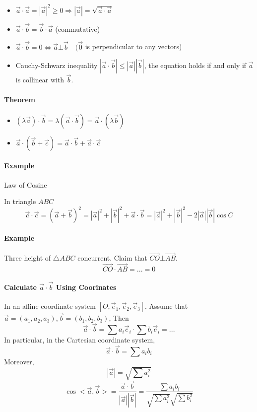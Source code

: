 \documentclass[11pt]{book}
\begin{document}
\begin{itemize}
  \item $\vec a \cdot \vec a  = |\vec a |^2 \geq 0 \Rightarrow |\vec a| = \sqrt{\vec a \cdot \vec a}$
  \item $\vec a \cdot \vec b  = \vec b \cdot \vec a$ (commutative)
  \item $\vec a \cdot \vec b = 0 \iff \vec a \bot \vec b \quad (\vec 0$ is perpendicular to any vectors)
  \item Cauchy-Schwarz inequality $|\vec a \cdot \vec b| \leq |\vec a|| \vec b|$, the equation holds if and only if $\vec a$ is collinear with $\vec b$.
\end{itemize}

\paragraph{Theorem}
\begin{itemize}
  \item $(\lambda \vec a) \cdot \vec b = \lambda (\vec a \cdot \vec b) = \vec a\cdot (\lambda \vec b)$
  \item $\vec a \cdot (\vec b + \vec c) = \vec a \cdot \vec b + \vec a \cdot \vec c$
\end{itemize}

\paragraph{Example} Law of Cosine

In triangle $ABC$
$$
\vec c \cdot \vec c = (\vec a + \vec b)^2 = |\vec a|^2+|\vec b|^2+\vec a \cdot \vec b = |\vec a|^2 + |\vec b|^2 - 2|\vec a||\vec b| \cos {C}
$$

\paragraph{Example} Three height of $\triangle ABC$ concurrent. Claim that $\overrightarrow{CO}\bot \overrightarrow{AB}$.
$$
\overrightarrow {CO} \cdot \overrightarrow{AB} = ... = 0
$$

\paragraph{Calculate $\vec a \cdot \vec b$ Using Coorinates}

In an affine coordinate system $[O,\vec e_1,\vec e_2,\vec e_3]$. Assume that $\vec a = (a_1,a_2,a_3), \vec b = (b_1,b_2,b_3)$, Then 
$$
\vec a \cdot \vec b = \sum a_i \vec e_i \cdot \sum b_i \vec e_i = ... 
$$
In particular, in the Cartesian coordinate system, 
$$
\vec a \cdot \vec b = \sum a_ib_i
$$
Moreover, 
$$
|\vec a| = \sqrt{\sum a_i^2}
$$
$$
\cos <\vec a, \vec b> = \frac{\vec a\cdot \vec b}{|\vec a||\vec b|}= \frac{\sum a_ib_i}{\sqrt{\sum a_i^2} \sqrt{\sum b_i^2}}
$$
\end{document}
